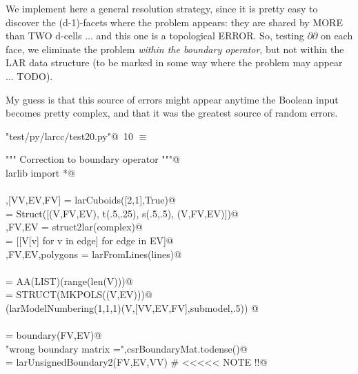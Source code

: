 \documentclass[11pt,oneside]{article}    %
\begin{document}
We implement here a general resolution strategy, since it is pretty  easy to discover the (d-1)-facets where the problem appears:  they are shared by MORE than TWO d-cells ... and this one is a topological ERROR. So, testing $\partial\partial$ on each face, we eliminate the problem \emph{within the boundary operator}, but not within the LAR data structure (to be marked in some way where the problem may appear ... TODO).

My guess is that this source of errors might appear anytime the Boolean input becomes pretty complex, and that it was the greatest source of random errors. 

\begin{flushleft} \small \label{scrap18}
\protect{}\verb@"test/py/larcc/test20.py"@\nobreak\ {\footnotesize 10 }$\equiv$
\vspace{-1ex}
\begin{list}{}{} \item
\mbox{}\verb@""" Correction to boundary operator """@\\
\mbox{}\verb@from larlib import *@\\
\mbox{}\verb@@\\
\mbox{}\verb@V,[VV,EV,FV] = larCuboids([2,1],True)@\\
\mbox{}\verb@complex = Struct([(V,FV,EV), t(.5,.25), s(.5,.5), (V,FV,EV)])@\\
\mbox{}\verb@V,FV,EV = struct2lar(complex)@\\
\mbox{}\verb@lines = [[V[v] for v in edge] for edge in EV]@\\
\mbox{}\verb@V,FV,EV,polygons = larFromLines(lines)@\\
\mbox{}\verb@@\\
\mbox{}\verb@VV = AA(LIST)(range(len(V)))@\\
\mbox{}\verb@submodel = STRUCT(MKPOLS((V,EV)))@\\
\mbox{}\verb@VIEW(larModelNumbering(1,1,1)(V,[VV,EV,FV],submodel,.5)) @\\
\mbox{}\verb@@\\
\mbox{}\verb@csrBoundaryMat = boundary(FV,EV)@\\
\mbox{}\verb@print "wrong boundary matrix =",csrBoundaryMat.todense()@\\
\mbox{}\verb@csrBoundaryMat = larUnsignedBoundary2(FV,EV,VV)  # <<<<< NOTE !!@\\

\end{list}
\end{flushleft}
\end{document}
